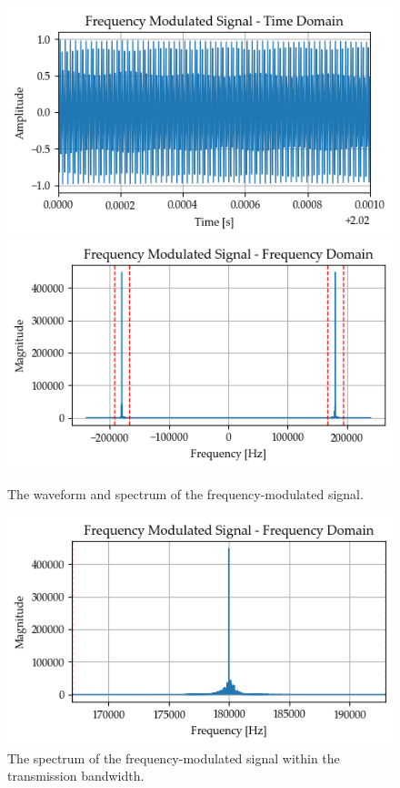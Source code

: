 \documentclass[../ECE459FinalProjectReport.tex]{subfiles}
\begin{document}
\begin{figure}[tb]
    \centering
    \includegraphics[width=0.49\linewidth]{plots/fm/fm_time_smallInterval.png}
    \includegraphics[width=0.49\linewidth]{plots/fm/fm_freq.png}
    \caption{The waveform and spectrum of the frequency-modulated signal.}
    \label{fig:fm-signal}
\end{figure}
\begin{figure}[tb]
    \centering
    \includegraphics[width=0.49\linewidth]{plots/fm/fm_freq_bt.png}
    \caption{The spectrum of the frequency-modulated signal within the transmission bandwidth.}
    \label{fig:fm-spectrum-tx-bw}
\end{figure}
\end{document}
